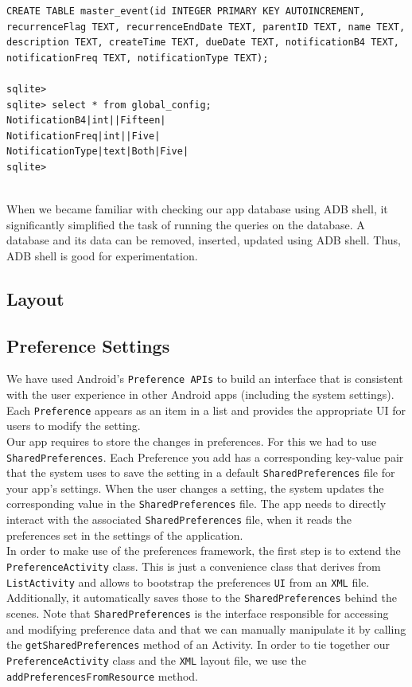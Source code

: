 \documentclass[10pt,a4paper]{report}
\begin{document}
\begin{description}
\begin{verbatim}
CREATE TABLE master_event(id INTEGER PRIMARY KEY AUTOINCREMENT, 
recurrenceFlag TEXT, recurrenceEndDate TEXT, parentID TEXT, name TEXT, 
description TEXT, createTime TEXT, dueDate TEXT, notificationB4 TEXT, 
notificationFreq TEXT, notificationType TEXT);

sqlite> 
sqlite> select * from global_config;
NotificationB4|int||Fifteen|
NotificationFreq|int||Five|
NotificationType|text|Both|Five|
sqlite> 


 \end{verbatim}
 
When we became familiar with checking our app database using ADB shell, it significantly simplified the task of running the queries on the database. A database and its data can be removed, inserted, updated using ADB shell. Thus, ADB shell is good for experimentation.

\end{description}

\subsection{Layout}

\subsection{Preference Settings}

We have used Android's \texttt{Preference APIs} to build an interface that is consistent with the user experience in other Android apps (including the system settings). Each \texttt{Preference} appears as an item in a list and provides the appropriate UI for users to modify the setting. \\

Our app requires to store the changes in preferences. For this we had to use \texttt{SharedPreferences}. Each Preference you add has a corresponding key-value pair that the system uses to save the setting in a default \texttt{SharedPreferences} file for your app's settings. When the user changes a setting, the system updates the corresponding value in the \texttt{SharedPreferences} file. The app needs to directly interact with the associated \texttt{SharedPreferences} file, when it reads the preferences set in the settings of the application. \\

In order to make use of the preferences framework, the first step is to extend the \texttt{PreferenceActivity} class. This is just a convenience class that derives from \texttt{ListActivity} and allows to bootstrap the preferences \texttt{UI} from an \texttt{XML} file. Additionally, it automatically saves those to the \texttt{SharedPreferences} behind the scenes. Note that \texttt{SharedPreferences} is the interface responsible for accessing and modifying preference data and that we can manually manipulate it by calling the \texttt{getSharedPreferences} method of an Activity. In order to tie together our \texttt{PreferenceActivity} class and the \texttt{XML} layout file, we use the \texttt{addPreferencesFromResource} method. 
\end{document}
